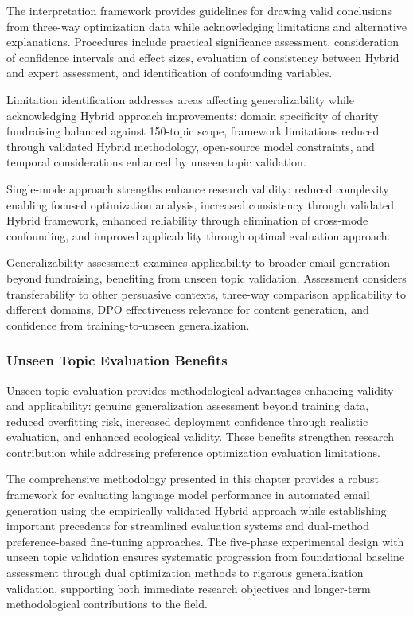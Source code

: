The interpretation framework provides guidelines for drawing valid conclusions from three-way optimization data while acknowledging limitations and alternative explanations. Procedures include practical significance assessment, consideration of confidence intervals and effect sizes, evaluation of consistency between Hybrid and expert assessment, and identification of confounding variables.

Limitation identification addresses areas affecting generalizability while acknowledging Hybrid approach improvements: domain specificity of charity fundraising balanced against 150-topic scope, framework limitations reduced through validated Hybrid methodology, open-source model constraints, and temporal considerations enhanced by unseen topic validation.

Single-mode approach strengths enhance research validity: reduced complexity enabling focused optimization analysis, increased consistency through validated Hybrid framework, enhanced reliability through elimination of cross-mode confounding, and improved applicability through optimal evaluation approach.

Generalizability assessment examines applicability to broader email generation beyond fundraising, benefiting from unseen topic validation. Assessment considers transferability to other persuasive contexts, three-way comparison applicability to different domains, DPO effectiveness relevance for content generation, and confidence from training-to-unseen generalization.

\subsubsection{Unseen Topic Evaluation Benefits}

Unseen topic evaluation provides methodological advantages enhancing validity and applicability: genuine generalization assessment beyond training data, reduced overfitting risk, increased deployment confidence through realistic evaluation, and enhanced ecological validity. These benefits strengthen research contribution while addressing preference optimization evaluation limitations.


The comprehensive methodology presented in this chapter provides a robust framework for evaluating language model performance in automated email generation using the empirically validated Hybrid approach while establishing important precedents for streamlined evaluation systems and dual-method preference-based fine-tuning approaches. The five-phase experimental design with unseen topic validation ensures systematic progression from foundational baseline assessment through dual optimization methods to rigorous generalization validation, supporting both immediate research objectives and longer-term methodological contributions to the field.


